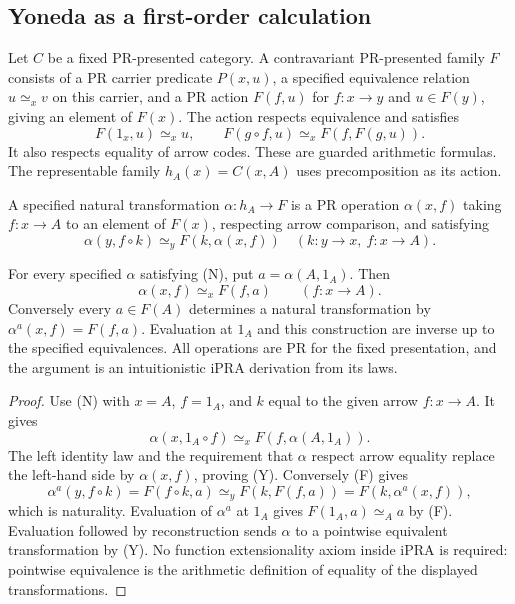 \subsection{Yoneda as a first-order calculation}
\label{subsec:yoneda}

Let $C$ be a fixed PR-presented category.  A contravariant PR-presented family
$F$ consists of a PR carrier predicate $P(x,u)$, a specified equivalence relation
$u\simeq_x v$ on this carrier, and a PR action $F(f,u)$ for $f:x\to y$ and
$u\in F(y)$, giving an element of $F(x)$.  The action respects equivalence and
satisfies
\[
 F(1_x,u)\simeq_xu,\qquad
 F(g\circ f,u)\simeq_xF(f,F(g,u)).                    \tag{F}
\]
It also respects equality of arrow codes.  These are guarded arithmetic
formulas.  The representable family $h_A(x)=C(x,A)$ uses precomposition as its
action.

A specified natural transformation $\alpha:h_A\to F$ is a PR operation
$\alpha(x,f)$ taking $f:x\to A$ to an element of $F(x)$, respecting arrow
comparison, and satisfying
\[
 \alpha(y,f\circ k)\simeq_y F(k,\alpha(x,f))
 \quad(k:y\to x,\ f:x\to A).                         \tag{N}
\]

\begin{theorem}
For every specified $\alpha$ satisfying (N), put
$a=\alpha(A,1_A)$.  Then
\[
 \alpha(x,f)\simeq_x F(f,a)\qquad(f:x\to A).          \tag{Y}
\]
Conversely every $a\in F(A)$ determines a natural transformation by
$\alpha^a(x,f)=F(f,a)$.  Evaluation at $1_A$ and this construction are inverse up
to the specified equivalences.  All operations are PR for the fixed
presentation, and the argument is an intuitionistic iPRA derivation from its
laws.
\end{theorem}
\begin{proof}
Use (N) with $x=A$, $f=1_A$, and $k$ equal to the given arrow $f:x\to A$.
It gives
\[
 \alpha(x,1_A\circ f)\simeq_x F(f,\alpha(A,1_A)).
\]
The left identity law and the requirement that $\alpha$ respect arrow equality
replace the left-hand side by $\alpha(x,f)$, proving (Y).  Conversely (F) gives
\[
 \alpha^a(y,f\circ k)=F(f\circ k,a)
 \simeq_y F(k,F(f,a))=F(k,\alpha^a(x,f)),
\]
which is naturality.  Evaluation of $\alpha^a$ at $1_A$ gives
$F(1_A,a)\simeq_Aa$ by (F).  Evaluation followed by reconstruction sends
$\alpha$ to a pointwise equivalent transformation by (Y).  No function
extensionality axiom inside iPRA is required: pointwise equivalence is the
arithmetic definition of equality of the displayed transformations.
\end{proof}

